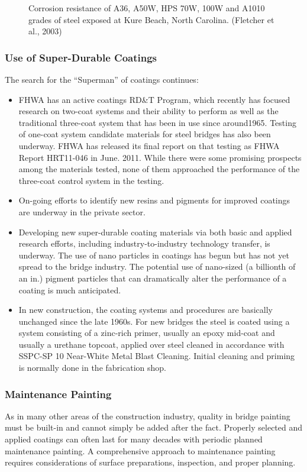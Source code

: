 \begin{figure}
  \caption{Corrosion resistance of A36, A50W, HPS 70W, 100W and A1010 grades of steel exposed at Kure Beach, North Carolina. (Fletcher et al., 2003)}
  \label{fig:corrosion-resistance-a36et}
\end{figure}

\subsubsection{Use of Super-Durable Coatings}
The search for the “Superman” of coatings continues:
\begin{itemize}
  \item FHWA has an active coatings RD\&T Program, which recently has focused research on two-coat systems and
  their ability to perform as well as the traditional three-coat system that has been in use since around1965.
  Testing of one-coat system candidate materials for steel bridges has also been underway. FHWA has released
  its final report on that testing as FHWA Report HRT11-046 in June. 2011. While there were some promising
  prospects among the materials tested, none of them approached the performance of the three-coat control
  system in the testing.
  \item On-going efforts to identify new resins and pigments for improved coatings are underway in the private
  sector.
  \item Developing new super-durable coating materials via both basic and applied research efforts, including
  industry-to-industry technology transfer, is underway. The use of nano particles in coatings has begun but has not yet spread to the bridge industry. The potential use of nano-sized (a billionth of an in.) pigment
  particles that can dramatically alter the performance of a coating is much anticipated.
  \item In new construction, the coating systems and procedures are basically unchanged since the late 1960s. For
  new bridges the steel is coated using a system consisting of a zinc-rich primer, usually an epoxy mid-coat
  and usually a urethane topcoat, applied over steel cleaned in accordance with SSPC-SP 10 Near-White Metal
  Blast Cleaning. Initial cleaning and priming is normally done in the fabrication shop.
\end{itemize}

\subsubsection{Maintenance Painting}
As in many other areas of the construction industry, quality in bridge painting must be built-in and cannot simply
be added after the fact. Properly selected and applied coatings can often last for many decades with periodic planned
maintenance painting. A comprehensive approach to maintenance painting requires considerations of surface
preparations, inspection, and proper planning.


